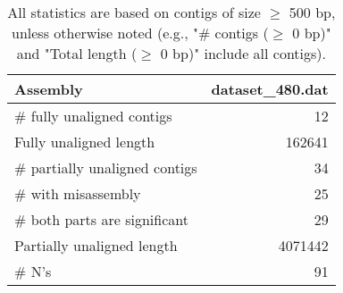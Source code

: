 \documentclass[12pt,a4paper]{article}
\begin{document}
\begin{table}[ht]
\begin{center}
\caption{All statistics are based on contigs of size $\geq$ 500 bp, unless otherwise noted (e.g., "\# contigs ($\geq$ 0 bp)" and "Total length ($\geq$ 0 bp)" include all contigs).}
\begin{tabular}{|l*{1}{|r}|}
\hline
Assembly & dataset\_480.dat \\ \hline
\# fully unaligned contigs & 12 \\ \hline
Fully unaligned length & 162641 \\ \hline
\# partially unaligned contigs & 34 \\ \hline
\hspace{5mm}\# with misassembly & 25 \\ \hline
\hspace{5mm}\# both parts are significant & 29 \\ \hline
Partially unaligned length & 4071442 \\ \hline
\# N's & 91 \\ \hline
\end{tabular}
\end{center}
\end{table}
\end{document}

